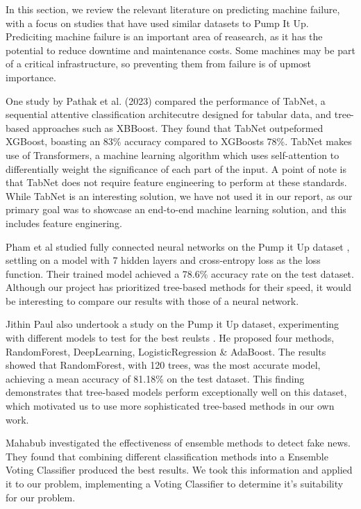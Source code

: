 \documentclass[conference]{IEEEtran}
\begin{document}
In this section, we review the relevant literature on predicting machine failure, with a focus on studies that have used similar datasets to Pump It Up. Prediciting machine failure is an important area of reasearch, as it has the potential to reduce downtime and maintenance costs. Some machines may be part of a critical infrastructure, so preventing them from failure is of upmost importance.

One study by Pathak et al. (2023) \cite{pathak2023pump} compared the performance of TabNet, a sequential attentive classification architecutre designed for tabular data, and tree-based approaches such as XBBoost. They found that TabNet outpeformed XGBoost, boasting an 83\% accuracy compared to XGBoosts 78\%. TabNet makes use of Transformers, a machine learning algorithm which uses self-attention to differentially weight the significance of each part of the input. A point of note is that TabNet does not require feature engineering to perform at these standards. While TabNet is an interesting solution, we have not used it in our report, as our primary goal was to showcase an end-to-end machine learning solution, and this includes feature enginering.

Pham et al studied fully connected neural networks on the Pump it Up dataset \cite{Pham_2018}, settling on a model with 7 hidden layers and cross-entropy loss as the loss function. Their trained model achieved a 78.6\% accuracy rate on the test dataset. Although our project has prioritized tree-based methods for their speed, it would be interesting to compare our results with those of a neural network.

Jithin Paul also undertook a study on the Pump it Up dataset, experimenting with different models to test for the best reulsts \cite{Paul_2023}. He proposed four methods, RandomForest, DeepLearning, LogisticRegression \& AdaBoost. The results showed that RandomForest, with 120 trees, was the most accurate model, achieving a mean accuracy of 81.18\% on the test dataset. This finding demonstrates that tree-based models perform exceptionally well on this dataset, which motivated us to use more sophisticated tree-based methods in our own work.

Mahabub \cite{Mahabub2020} investigated the effectiveness of ensemble methods to detect fake news. They found that combining different classification methods into a Ensemble Voting Classifier produced the best results. We took this information and applied it to our problem, implementing a Voting Classifier to determine it's suitability for our problem.
\end{document}

